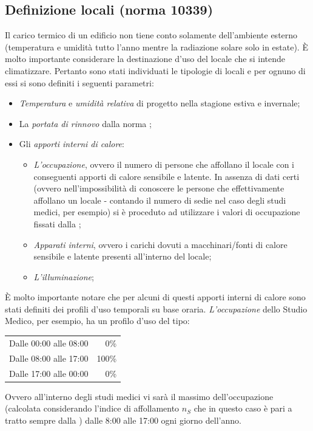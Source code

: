 \subsection{Definizione locali (norma 10339)}
Il carico termico di un edificio non tiene conto solamente dell'ambiente esterno (temperatura e umidità tutto l'anno mentre la radiazione solare solo in estate). È molto importante considerare la destinazione d'uso del locale che si intende climatizzare. Pertanto sono stati individuati le tipologie di locali e per ognuno di essi si sono definiti i seguenti parametri:
\begin{itemize}
	\item \emph{Temperatura} e \emph{umidità relativa} di progetto nella stagione estiva e invernale;
	\item La \emph{portata di rinnovo} dalla norma \norvent;
	\item Gli \emph{apporti interni di calore}:
	\begin{itemize}
		\item \emph{L'occupazione}, ovvero il numero di persone che affollano il locale con i conseguenti apporti di calore sensibile e latente. In assenza di dati certi (ovvero nell'impossibilità di conoscere le persone che effettivamente affollano un locale - contando il numero di sedie nel caso degli studi medici, per esempio) si è proceduto ad utilizzare i valori di occupazione fissati dalla \norvent;
		\item \emph{Apparati interni}, ovvero i carichi dovuti a macchinari/fonti di calore sensibile e latente presenti all'interno del locale;
		\item \emph{L'illuminazione};
	\end{itemize}
\end{itemize}
È molto importante notare che per alcuni di questi apporti interni di calore sono stati definiti dei profili d'uso temporali su base oraria. \emph{L'occupazione} dello Studio Medico, per esempio, ha un profilo d'uso del tipo:
\begin{center}
	\begin{tabular}{lr}
		\toprule
		Dalle 00:00 alle 08:00 & 0\% \\
		Dalle 08:00 alle 17:00 & 100\% \\
		Dalle 17:00 alle 00:00 & 0\% \\
		\bottomrule
	\end{tabular}
\end{center}
Ovvero all'interno degli studi medici vi sarà il massimo dell'occupazione (calcolata considerando l'indice di affollamento $n_S$ che in questo caso è pari a  tratto sempre dalla \norvent) dalle 8:00 alle 17:00 ogni giorno dell'anno.

